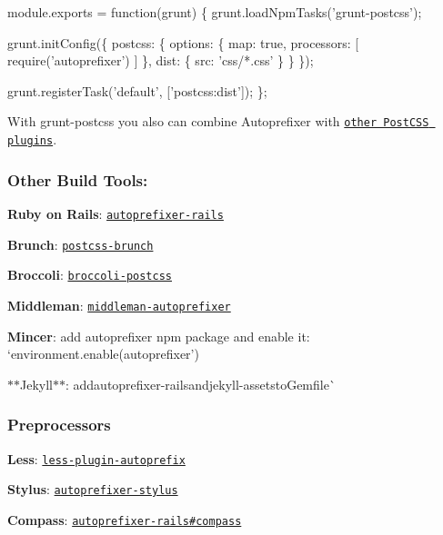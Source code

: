 \begin{DoxyCode}
module.exports = function(grunt) \{
    grunt.loadNpmTasks('grunt-postcss');

    grunt.initConfig(\{
        postcss: \{
            options: \{
                map: true,
                processors: [
                    require('autoprefixer')
                ]
            \},
            dist: \{
                src: 'css/*.css'
            \}
        \}
    \});

    grunt.registerTask('default', ['postcss:dist']);
\};
\end{DoxyCode}


With {\ttfamily grunt-\/postcss} you also can combine Autoprefixer with \href{https://github.com/postcss/postcss#plugins}{\tt other Post\+C\+SS plugins}.

\subsubsection*{Other Build Tools\+:}


\begin{DoxyItemize}
\item {\bfseries Ruby on Rails}\+: \href{https://github.com/ai/autoprefixer-rails}{\tt autoprefixer-\/rails}
\item {\bfseries Brunch}\+: \href{https://github.com/iamvdo/postcss-brunch}{\tt postcss-\/brunch}
\item {\bfseries Broccoli}\+: \href{https://github.com/jeffjewiss/broccoli-postcss}{\tt broccoli-\/postcss}
\item {\bfseries Middleman}\+: \href{https://github.com/middleman/middleman-autoprefixer}{\tt middleman-\/autoprefixer}
\item {\bfseries Mincer}\+: add {\ttfamily autoprefixer} npm package and enable it\+: `environment.\+enable(\textquotesingle{}autoprefixer'){\ttfamily }
\item {\ttfamily $\ast$$\ast$\+Jekyll$\ast$$\ast$\+: add}autoprefixer-\/rails{\ttfamily and}jekyll-\/assets{\ttfamily to}Gemfile\`{}
\end{DoxyItemize}

\subsubsection*{Preprocessors}


\begin{DoxyItemize}
\item {\bfseries Less}\+: \href{https://github.com/less/less-plugin-autoprefix}{\tt less-\/plugin-\/autoprefix}
\item {\bfseries Stylus}\+: \href{https://github.com/jenius/autoprefixer-stylus}{\tt autoprefixer-\/stylus}
\item {\bfseries Compass}\+: \href{https://github.com/ai/autoprefixer-rails#compass}{\tt autoprefixer-\/rails\#compass}
\end{DoxyItemize}

